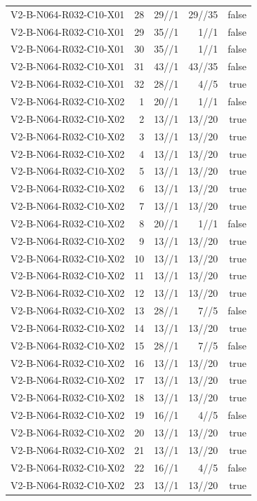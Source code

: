 {\begin{longtable}{lrrrr}
V2-B-N064-R032-C10-X01 & 28 & 29//1 & 29//35 & false \\
V2-B-N064-R032-C10-X01 & 29 & 35//1 & 1//1 & false \\
V2-B-N064-R032-C10-X01 & 30 & 35//1 & 1//1 & false \\
V2-B-N064-R032-C10-X01 & 31 & 43//1 & 43//35 & false \\
V2-B-N064-R032-C10-X01 & 32 & 28//1 & 4//5 & true \\
V2-B-N064-R032-C10-X02 & 1 & 20//1 & 1//1 & false \\
V2-B-N064-R032-C10-X02 & 2 & 13//1 & 13//20 & true \\
V2-B-N064-R032-C10-X02 & 3 & 13//1 & 13//20 & true \\
V2-B-N064-R032-C10-X02 & 4 & 13//1 & 13//20 & true \\
V2-B-N064-R032-C10-X02 & 5 & 13//1 & 13//20 & true \\
V2-B-N064-R032-C10-X02 & 6 & 13//1 & 13//20 & true \\
V2-B-N064-R032-C10-X02 & 7 & 13//1 & 13//20 & true \\
V2-B-N064-R032-C10-X02 & 8 & 20//1 & 1//1 & false \\
V2-B-N064-R032-C10-X02 & 9 & 13//1 & 13//20 & true \\
V2-B-N064-R032-C10-X02 & 10 & 13//1 & 13//20 & true \\
V2-B-N064-R032-C10-X02 & 11 & 13//1 & 13//20 & true \\
V2-B-N064-R032-C10-X02 & 12 & 13//1 & 13//20 & true \\
V2-B-N064-R032-C10-X02 & 13 & 28//1 & 7//5 & false \\
V2-B-N064-R032-C10-X02 & 14 & 13//1 & 13//20 & true \\
V2-B-N064-R032-C10-X02 & 15 & 28//1 & 7//5 & false \\
V2-B-N064-R032-C10-X02 & 16 & 13//1 & 13//20 & true \\
V2-B-N064-R032-C10-X02 & 17 & 13//1 & 13//20 & true \\
V2-B-N064-R032-C10-X02 & 18 & 13//1 & 13//20 & true \\
V2-B-N064-R032-C10-X02 & 19 & 16//1 & 4//5 & false \\
V2-B-N064-R032-C10-X02 & 20 & 13//1 & 13//20 & true \\
V2-B-N064-R032-C10-X02 & 21 & 13//1 & 13//20 & true \\
V2-B-N064-R032-C10-X02 & 22 & 16//1 & 4//5 & false \\
V2-B-N064-R032-C10-X02 & 23 & 13//1 & 13//20 & true \\

\end{longtable}}
